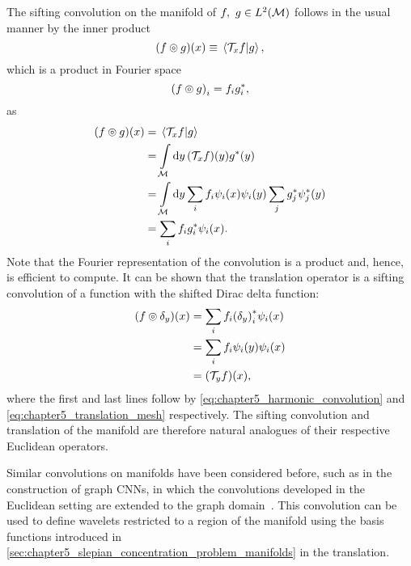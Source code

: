 The sifting convolution on the manifold of \(f,\ g \in L^{2}(\mathcal{M})\) follows in the usual manner by the inner product
%
\begin{equation}
	(f \circledcirc{} g)(x)
	\equiv \braket*{\mathcal{T}_{x}f}{g},
\end{equation}
%
which is a product in Fourier space
%
\begin{equation}\label{eq:chapter5_harmonic_convolution}
	{(f \circledcirc{} g)}_{i}
	= f_{i} g_{i}^{\ast},
\end{equation}
%
as
%
\begin{align}
	(f \circledcirc{} g)(x)
	 & = \braket*{\mathcal{T}_{x}f}{g} \nonumber{}                                                                                        \\
	 & = \int\limits_{\mathcal{M}} \dd{y} (\mathcal{T}_{x}f)(y) g^{\ast}(y) \nonumber{}                                                    \\
	 & = \int\limits_{\mathcal{M}} \dd{y} \sum\limits_{i} f_{i} \psi_{i}(x) \psi_{i}(y) \sum\limits_{j} g_{j}^{\ast} \psi_{j}^{\ast}(y) \nonumber{} \\
	 & = \sum\limits_{i} f_{i} g_{i}^{\ast} \psi_{i}(x).
\end{align}
%
Note that the Fourier representation of the convolution is a product and, hence, is efficient to compute.
It can be shown that the translation operator is a sifting convolution of a function with the shifted Dirac delta function:
%
\begin{align}
	(f \circledcirc{} \delta_{y})(x)
	 & = \sum\limits_{i} f_{i} {(\delta_{y})}_{i}^{\ast} \psi_{i}(x) \nonumber{} \\
	 & = \sum\limits_{i} f_{i} \psi_{i}(y) \psi_{i}(x) \nonumber{}          \\
	 & = (\mathcal{T}_{y}f)(x),
\end{align}
%
where the first and last lines follow by \cref{eq:chapter5_harmonic_convolution} and \cref{eq:chapter5_translation_mesh} respectively.
The sifting convolution and translation of the manifold are therefore natural analogues of their respective Euclidean operators.

Similar convolutions on manifolds have been considered before, such as in the construction of graph CNNs,
in which the convolutions developed in the Euclidean setting are extended to the graph domain~\cite{Bruna2014,Henaff2015,Defferrard2016}.
This convolution can be used to define wavelets restricted to a region of the manifold using the basis functions introduced in \cref{sec:chapter5_slepian_concentration_problem_manifolds} in the translation.

